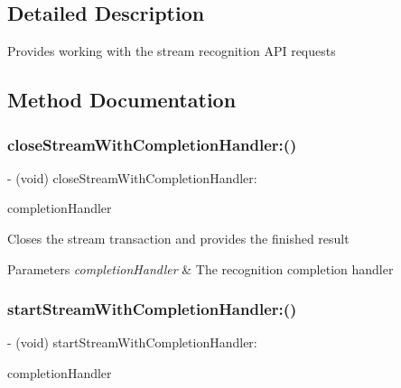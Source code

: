 \subsection{Detailed Description}
Provides working with the stream recognition A\+PI requests 

\subsection{Method Documentation}
\hypertarget{interface_s_t_c_a_s_r_stream_networking_manager_ac401b83981c6ca10432d6af274002a47}{}\label{interface_s_t_c_a_s_r_stream_networking_manager_ac401b83981c6ca10432d6af274002a47} 
\subsubsection{\texorpdfstring{close\+Stream\+With\+Completion\+Handler\+:()}{closeStreamWithCompletionHandler:()}}
{\footnotesize\ttfamily -\/ (void) close\+Stream\+With\+Completion\+Handler\+: \begin{DoxyParamCaption}\item[{(Completion\+Handler)}]{completion\+Handler }\end{DoxyParamCaption}}

Closes the stream transaction and provides the finished result 
\begin{DoxyParams}{Parameters}
{\em completion\+Handler} & The recognition completion handler \\
\hline
\end{DoxyParams}
\hypertarget{interface_s_t_c_a_s_r_stream_networking_manager_a49f5bd94217465b2013e4e2b44e46f68}{}\label{interface_s_t_c_a_s_r_stream_networking_manager_a49f5bd94217465b2013e4e2b44e46f68} 
\subsubsection{\texorpdfstring{start\+Stream\+With\+Completion\+Handler\+:()}{startStreamWithCompletionHandler:()}}
{\footnotesize\ttfamily -\/ (void) start\+Stream\+With\+Completion\+Handler\+: \begin{DoxyParamCaption}\item[{(Completion\+Handler)}]{completion\+Handler }\end{DoxyParamCaption}}

